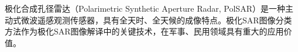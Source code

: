 \begin{chineseabstract}







  极化合成孔径雷达（Polarimetric Synthetic Aperture Radar, PolSAR）是一种主动式微波遥感观测传感器，具有全天时、全天候的成像特点。极化SAR图像分类方法作为极化SAR图像解译中的关键技术，在军事、民用领域具有重大的应用价值。


\end{chineseabstract}

